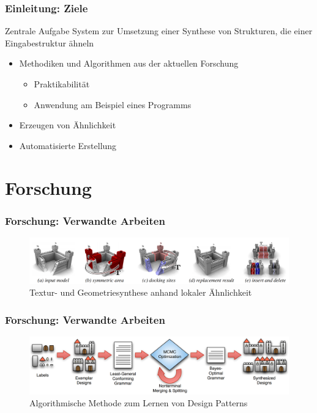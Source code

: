 \documentclass[12pt]{beamer}
\begin{document}
    \begin{frame}
        \frametitle{Einleitung: Ziele}

        \begin{block}{Zentrale Aufgabe}
            System zur Umsetzung einer Synthese von Strukturen, die einer Eingabestruktur ähneln
        \end{block}

        \begin{itemize}
            \setlength\itemsep{1.4em}
            \item<2-> Methodiken und Algorithmen aus der aktuellen Forschung
            \begin{itemize}
                \item Praktikabilität
                \item Anwendung am Beispiel eines Programms
            \end{itemize}
            \item<3-> Erzeugen von Ähnlichkeit
            \item<4-> Automatisierte Erstellung
        \end{itemize}
    \end{frame}

    \section{Forschung}
    \label{sec:forschung}
    \begin{frame}
        \frametitle{Forschung: Verwandte Arbeiten}
        
        \begin{figure}
            \centering
            \includegraphics[width=12cm]{../images/bokeloh_2010_system.PNG}
            \caption{Textur- und Geometriesynthese anhand lokaler Ähnlichkeit}
        \end{figure}
    \end{frame}

    \begin{frame}
        \frametitle{Forschung: Verwandte Arbeiten}

        \begin{figure}
            \centering
            \includegraphics[width=12cm]{../images/talton_2012_system.PNG}
            \caption{Algorithmische Methode zum Lernen von Design Patterns}
        \end{figure}
    \end{frame}
\end{document}
